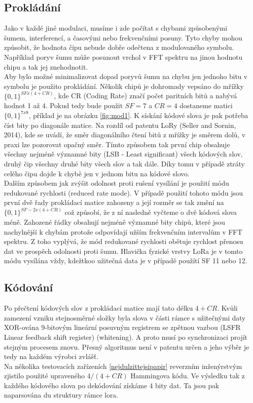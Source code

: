 \documentclass{ctuthesis}
\begin{document}
\subsection{Prokládání}
Jako v každé jiné modulaci, musíme i zde počítat s chybami způsobenými šumem, interferencí, a časovými nebo frekvenčními posuny. Tyto chyby mohou způsobit, že hodnota čipu nebude dobře odečtena z modulovaného symbolu. Například poryv šumu může posunout vrchol v FFT spektru na jinou hodnotu chipu a tak jej znehodnotit.\\
Aby bylo možné minimalizovat dopad poryvů šumu na chybu jen jednoho bitu v symbolu je použito prokládání. Několik chipů je dohromady vepsáno do mřížky $\{0,1\}^{SF x (4 + CR)}$, kde CR (Coding Rate) značí počet paritních bitů a nabývá hodnot 1 až 4. Pokud tedy bude použit $SF = 7$ a $CR =4$ dostaneme matici  $\{0,1\}^{7 x 8}$, příklad je na obrázku \ref{fig:mod1}. K sískání kódové slova je pak potřeba číst bity po diagonále matice. Na rozdíl od patentu LoRy (Seller and Sornin, 2014), kde se uvádí, že směr diagonálního čtení bitů z mřížky je směrem dolů, v praxi lze pozorovat opačný směr. Tímto způsobem tak první chip obsahuje všechny nejméně významné bity (LSB - Least significant) všech kódových slov, druhý čip všechny druhé bity všech slov a tak dále. Díky tomu v případě ztráty celého čipu dojde k chybě jen v jednom bitu na kódové slovo.\\
Dalším způsobem jak zvýšit odolnost proti rušení vysílání je použití módu redukované rychlosti (reduced rate mode). V případě použití tohoto módu jsou první dvě řady prokládací matice zahozeny a její rozměr se tak změní na $\{0,1\}^{SF-2 x (4 + CR)}$ což způsobí, že z ní nasledně vyčteme o dvě kódová slova méně. Zahozené řádky obsahují nejméně významné bity chipů, které jsou nachylnější k chybám protože odpovídají užším frekvenčním intervalům v FFT spektru. Z toho vyplývá, že mód redukované rychlosti obětuje rychlost přenosu dat ve prospěch odolnosti proti šumu. Hlavička fyzické vrstvy LoRa je v tomto módu vysílána vždy, kdežtkoo užitečná data je v případě použítí SF 11 nebo 12.

\subsection{Kódování}
Po přečtení kódových slov z prokládací matice mají tato délku $4 + CR$. Kvůli zamezení vzniku stejnosměrné složky byla slova v části rámce s užitečnými daty XOR-ována 9-bitovým lineární posuvným registrem se zpětnou vazbou (LSFR Linear feedback shift register) (whitening). A proto musí po synchronizaci projít stejným procesem znovu. Přesný algoritmus není v patentu určen a jeho výběr je tedy na každém výrobci zvlášť. \\
Na několika testovacích zařízeních \ref{nejdulzittejsipapir} reverzním inženýrstvým zjistilo použité upraveného $4/(4 + CR)$ Hammingova kódu. Ve výsledku tak z každého kódového slova po dekódování získáme 4 bity dat. Ta jsou pak naparsována du struktury rámce lora.
\end{document}
